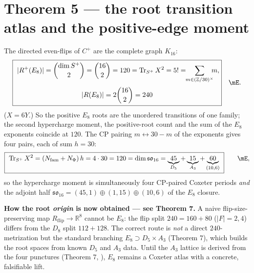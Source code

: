 \section*{Theorem 5 --- the root transition atlas and the positive-edge moment}
The directed even-flips of $C^+$ are the complete graph $K_{16}$:
\begin{equation}
  \boxed{\ \begin{gathered}
  |R^+(E_8)|=\binom{\dim S^+}{2}=\binom{16}{2}=120=\operatorname{Tr}_{S^+}X^2=5!=\!\!\sum_{m\in(\mathbb Z/30)^\times}\!\!\!m,\\[2pt]
  |R(E_8)|=2\binom{16}{2}=240\ \end{gathered}}\quad\mE .
\end{equation}
($X=6Y$.) So the positive $E_8$ roots are the unordered transitions of one family; the second
hypercharge moment, the positive-root count and the sum of the $E_8$ exponents coincide at $120$.
The CP pairing $m\leftrightarrow 30-m$ of the exponents gives four pairs, each of sum $h=30$:
\begin{equation}
  \boxed{\ \operatorname{Tr}_{S^+}X^2=(N_{\mathrm{fam}}+N_\Phi)\,h=4\cdot30=120=\dim\mathfrak{so}_{16}=\underbrace{45}_{D_5}+\underbrace{15}_{A_3}+\underbrace{60}_{(10,6)}\ }\qquad\mE ,
\end{equation}
so the hypercharge moment is simultaneously four CP-paired Coxeter periods \emph{and} the adjoint
half $\mathfrak{so}_{16}=(45,1)\oplus(1,15)\oplus(10,6)$ of the $E_8$ closure.
\par\smallskip\noindent\textbf{How the root \emph{origin} is now obtained --- see Theorem 7.}
A naive flip-size-preserving map $R_{\mathrm{flip}}\to\mathbb R^8$ cannot be $E_8$: the flip split
$240=160+80$ ($|F|=2,4$) differs from the $D_8$ split $112+128$. The correct route is \emph{not} a
direct $240$-metrization but the standard branching $E_8\supset D_5\times A_3$ (Theorem 7), which
builds the root spaces from known $D_5$ and $A_3$ data. Until the $A_3$ lattice is derived from the
four punctures (Theorem 7, \mO), $E_8$ remains a Coxeter atlas with a concrete, falsifiable lift.
\par\smallskip

